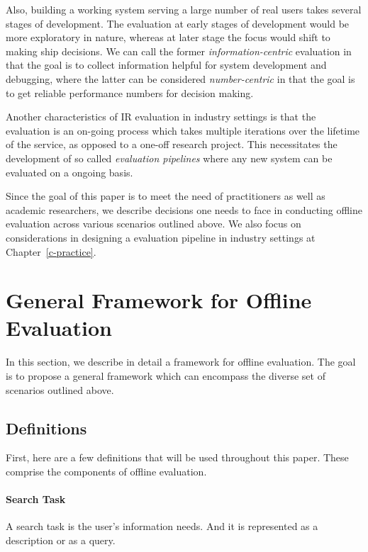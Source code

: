 Also, building a working system serving a large number of real users takes several stages of development. The evaluation at early stages of development would be more exploratory in nature, whereas at later stage the focus would shift to making ship decisions. We can call the former \textit{information-centric} evaluation in that the goal is to collect information helpful for system development and debugging, where the latter can be considered \textit{number-centric} in that the goal is to get reliable performance numbers for decision making.

Another characteristics of IR evaluation in industry settings is that the evaluation is an on-going process which takes multiple iterations over the lifetime of the service, as opposed to a one-off research project. This necessitates the development of so called \textit{evaluation pipelines} where any new system can be evaluated on a ongoing basis.

Since the goal of this paper is to meet the need of practitioners as well as academic researchers, we describe decisions one needs to face in conducting offline evaluation across various scenarios outlined above. We also focus on considerations in designing a evaluation pipeline in industry settings at Chapter~\ref{c-practice}.

\section{General Framework for Offline Evaluation}

In this section, we describe in detail a framework for offline evaluation. The goal is to propose a general framework which can encompass the diverse set of scenarios outlined above. 

\subsection{Definitions}

First, here are a few definitions that will be used throughout this paper. These comprise the components of offline evaluation.

\paragraph{Search Task}  A search task is the user's information needs. And it is represented as a description or as a query.

